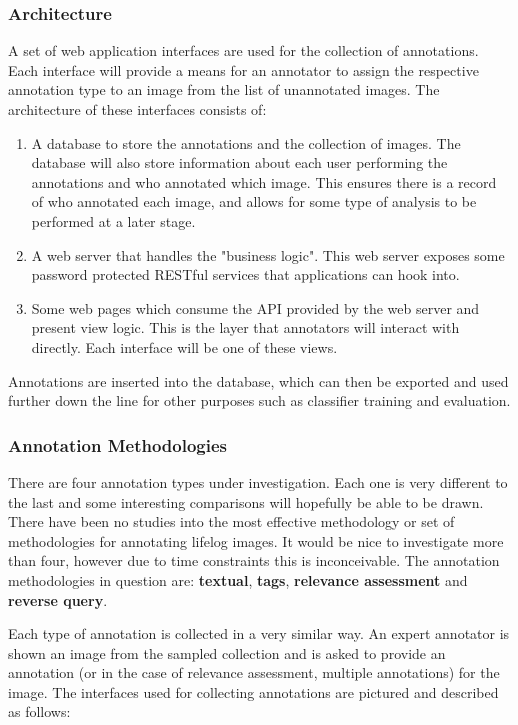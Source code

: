 \subsubsection{Architecture}
A set of web application interfaces are used for the collection of annotations. Each interface will provide a means for an annotator to assign the respective annotation type to an image from the list of unannotated images. The architecture of these interfaces consists of:
\begin{enumerate}
    \item A database to store the annotations and the collection of images. The database will also store information about each user performing the annotations and who annotated which image. This ensures there is a record of who annotated each image, and allows for some type of analysis to be performed at a later stage.
    \item A web server that handles the "business logic". This web server exposes some password protected RESTful services that applications can hook into.
    \item Some web pages which consume the API provided by the web server and present view logic. This is the layer that annotators will interact with directly. Each interface will be one of these views.
\end{enumerate}

Annotations are inserted into the database, which can then be exported and used further down the line for other purposes such as  classifier training and evaluation. 

\subsubsection{Annotation Methodologies}

There are four annotation types under investigation. Each one is very different to the last and some interesting comparisons will hopefully be able to be drawn. There have been no studies into the most effective methodology or set of methodologies for annotating lifelog images. It would be nice to investigate more than four, however due to time constraints this is inconceivable. The annotation methodologies in question are: \textbf{textual}, \textbf{tags}, \textbf{relevance assessment} and \textbf{reverse query}. 

Each type of annotation is collected in a very similar way. An expert annotator is shown an image from the sampled collection and is asked to provide an annotation (or in the case of relevance assessment, multiple annotations) for the image. The interfaces used for collecting annotations are pictured and described as follows:

